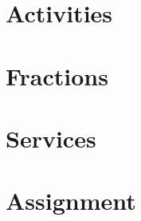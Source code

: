 \graphicspath{{./lab02/Images/}}


\maketocpage


\section{Activities}
\section{Fractions}
\section{Services}

\section{Assignment}